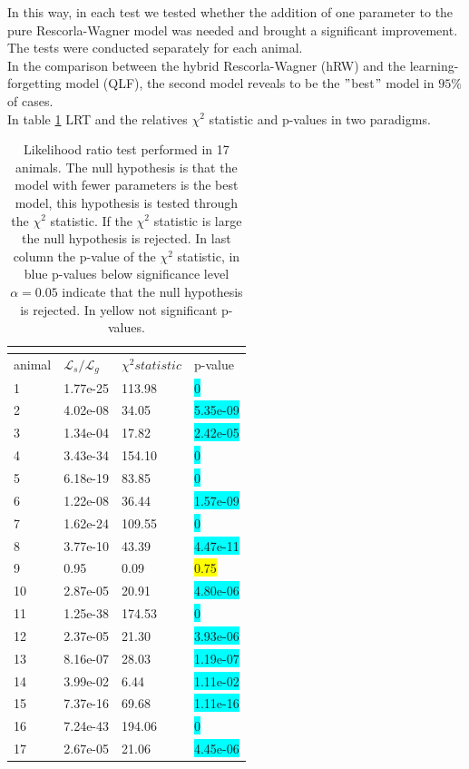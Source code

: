 In this way, in each test we tested whether the addition of one parameter to the pure Rescorla-Wagner model was needed and brought a significant improvement. The tests were conducted separately for each animal.\\In the comparison between the hybrid Rescorla-Wagner (hRW) and the learning-forgetting model (QLF), the second model reveals to be the $"$best$"$ model in $95\%$ of cases.\\
In table \ref{tab:ModelComparison} LRT and the relatives $\chi^2$ statistic and p-values in two paradigms.
\begin{table}[H]
\begin{tabular}{|p{3cm}|p{3cm}|p{3cm}|p{3cm}|}
\hline
\multicolumn{4}{|c|}{\cellcolor{blue!25}{Comparison between hRW model and QLF model (Likelihood ratio test)}}\\
\hline
 \cellcolor[gray]{0.9} animal & \cellcolor[gray]{0.9} $\mathcal{L}_s / \mathcal{L}_g$& \cellcolor[gray]{0.9} $\chi^2 statistic$ & \cellcolor[gray]{0.9} p-value\\
 \hline
 1& 1.77e-25 & 113.98 & \colorbox{cyan}{0}\\
 \hline
 2& 4.02e-08 & 34.05 & \colorbox{cyan}{5.35e-09}\\
 \hline
 3 & 1.34e-04 & 17.82 & \colorbox{cyan}{2.42e-05}\\
 \hline
 4 & 3.43e-34 & 154.10 & \colorbox{cyan}{0}\\
 \hline
 5 & 6.18e-19 & 83.85 & \colorbox{cyan}{0}\\
 \hline
 6 & 1.22e-08 & 36.44 & \colorbox{cyan}{1.57e-09}\\
 \hline
 7 & 1.62e-24 & 109.55 & \colorbox{cyan}{0}\\
 \hline
 8 & 3.77e-10 & 43.39 & \colorbox{cyan}{4.47e-11}\\
 \hline
 9 & 0.95 & 0.09 & \colorbox{yellow}{0.75}\\
 \hline
 10 & 2.87e-05 & 20.91 & \colorbox{cyan}{4.80e-06}\\
 \hline
 11 & 1.25e-38 & 174.53 & \colorbox{cyan}{0}\\
 \hline
 12 & 2.37e-05 & 21.30 & \colorbox{cyan}{3.93e-06}\\
 \hline
 13 & 8.16e-07 & 28.03 & \colorbox{cyan}{1.19e-07}\\
 \hline
 14 & 3.99e-02 & 6.44 & \colorbox{cyan}{1.11e-02}\\
 \hline
 15 & 7.37e-16 & 69.68 & \colorbox{cyan}{1.11e-16}\\
 \hline
 16 & 7.24e-43 & 194.06 & \colorbox{cyan}{0}\\
 \hline
 17 & 2.67e-05 & 21.06 & \colorbox{cyan}{4.45e-06}\\
 \hline
\end{tabular}
\caption{Likelihood ratio test performed in 17 animals. The null hypothesis is that the model with fewer parameters is the best model, this hypothesis is tested through the $\chi^2$ statistic. If the $\chi^2$ statistic is large the null hypothesis is rejected. In last column the p-value of the $\chi^2$ statistic, in blue p-values below significance level $\alpha=0.05$ indicate that the null hypothesis is rejected. In yellow not significant p-values.}
\label{tab:ModelComparison}
\end{table}
